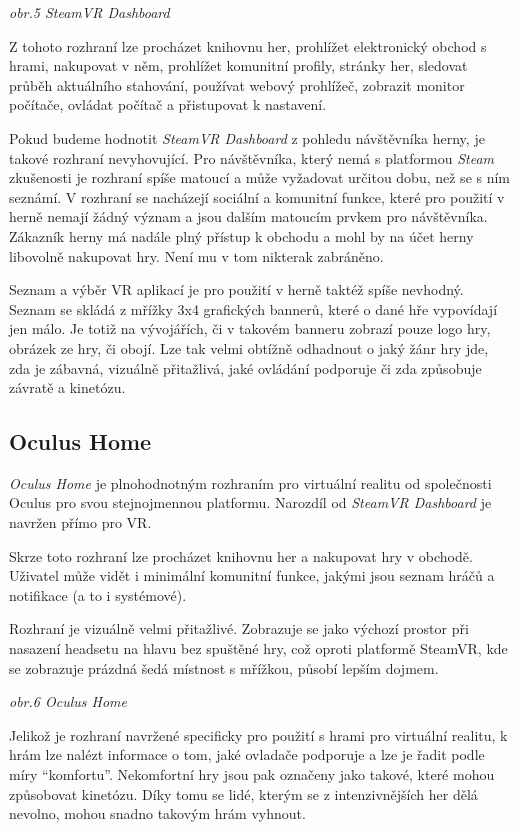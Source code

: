 \emph{obr.5 SteamVR Dashboard}

Z tohoto rozhraní lze procházet knihovnu her, prohlížet elektronický
obchod s hrami, nakupovat v něm, prohlížet komunitní profily, stránky
her, sledovat průběh aktuálního stahování, používat webový prohlížeč,
zobrazit monitor počítače, ovládat počítač a přistupovat k nastavení.

Pokud budeme hodnotit \emph{SteamVR Dashboard} z pohledu návštěvníka
herny, je takové rozhraní nevyhovující. Pro návštěvníka, který nemá s
platformou \emph{Steam} zkušenosti je rozhraní spíše matoucí a může
vyžadovat určitou dobu, než se s ním seznámí. V rozhraní se nacházejí
sociální a komunitní funkce, které pro použití v herně nemají žádný
význam a jsou dalším matoucím prvkem pro návštěvníka. Zákazník herny má
nadále plný přístup k obchodu a mohl by na účet herny libovolně
nakupovat hry. Není mu v tom nikterak zabráněno.

Seznam a výběr VR aplikací je pro použití v herně taktéž spíše nevhodný.
Seznam se skládá z mřížky 3x4 grafických bannerů, které o dané hře
vypovídají jen málo. Je totiž na vývojářích, či v takovém banneru
zobrazí pouze logo hry, obrázek ze hry, či obojí. Lze tak velmi obtížně
odhadnout o jaký žánr hry jde, zda je zábavná, vizuálně přitažlivá, jaké
ovládání podporuje či zda způsobuje závratě a kinetózu.

\subsection{Oculus Home}\label{oculus-home}

\emph{Oculus Home} je plnohodnotným rozhraním pro virtuální realitu od
společnosti Oculus pro svou stejnojmennou platformu. Narozdíl od
\emph{SteamVR Dashboard} je navržen přímo pro VR.

Skrze toto rozhraní lze procházet knihovnu her a nakupovat hry v
obchodě. Uživatel může vidět i minimální komunitní funkce, jakými jsou
seznam hráčů a notifikace (a to i systémové).

Rozhraní je vizuálně velmi přitažlivé. Zobrazuje se jako výchozí prostor
při nasazení headsetu na hlavu bez spuštěné hry, což oproti platformě
SteamVR, kde se zobrazuje prázdná šedá místnost s mřížkou, působí lepším
dojmem.


\emph{obr.6 Oculus Home}

Jelikož je rozhraní navržené specificky pro použití s hrami pro
virtuální realitu, k hrám lze nalézt informace o tom, jaké ovladače
podporuje a lze je řadit podle míry ``komfortu''. Nekomfortní hry jsou
pak označeny jako takové, které mohou způsobovat kinetózu. Díky tomu se
lidé, kterým se z intenzivnějších her dělá nevolno, mohou snadno takovým
hrám vyhnout.

